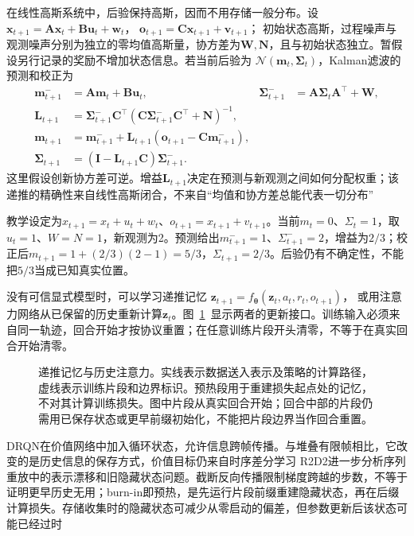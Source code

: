 在线性高斯系统中，后验保持高斯，因而不用存储一般分布。设
$\bm x_{t+1}=\bm A\bm x_t+\bm B\bm u_t+\bm w_t$，
$\bm o_{t+1}=\bm C\bm x_{t+1}+\bm v_{t+1}$；
初始状态高斯，过程噪声与观测噪声分别为独立的零均值高斯量，协方差为$\bm W,\bm N$，且与初始状态独立。暂假设另行记录的奖励不增加状态信息。若当前后验为
$\mathcal N(\bm m_t,\bm\Sigma_t)$，Kalman滤波的预测和校正为
\begin{align}
  \label{eq:rl-information-kalman}
  \bm m^-_{t+1}&=\bm A\bm m_t+\bm B\bm u_t,&
  \bm\Sigma^-_{t+1}&=\bm A\bm\Sigma_t\bm A^\top+\bm W,\nonumber\\
  \bm L_{t+1}&=\bm\Sigma^-_{t+1}\bm C^\top
     (\bm C\bm\Sigma^-_{t+1}\bm C^\top+\bm N)^{-1},\nonumber\\
  \bm m_{t+1}&=\bm m^-_{t+1}
       +\bm L_{t+1}(\bm o_{t+1}-\bm C\bm m^-_{t+1}),\nonumber\\
  \bm\Sigma_{t+1}&=(\bm I-\bm L_{t+1}\bm C)\bm\Sigma^-_{t+1}.
\end{align}
这里假设创新协方差可逆。增益$\bm L_{t+1}$决定在预测与新观测之间如何分配权重；该递推的精确性来自线性高斯闭合，不来自“均值和协方差总能代表一切分布”

\begin{example}[一次标量滤波]
  \label{ex:rl-information-kalman}
  教学设定为$x_{t+1}=x_t+u_t+w_t$、$o_{t+1}=x_{t+1}+v_{t+1}$。当前$m_t=0$、$\Sigma_t=1$，取$u_t=1$、$W=N=1$，新观测为2。预测给出$m^-_{t+1}=1$、$\Sigma^-_{t+1}=2$，增益为$2/3$；校正后$m_{t+1}=1+(2/3)(2-1)=5/3$，$\Sigma_{t+1}=2/3$。后验仍有不确定性，不能把$5/3$当成已知真实位置。
\end{example}

没有可信显式模型时，可以学习递推记忆
$\bm z_{t+1}=f_{\bm\theta}(\bm z_t,a_t,r_t,o_{t+1})$，
或用注意力网络从已保留的历史重新计算$\bm z_t$。图~\ref{fig:rl-information-memory}~显示两者的更新接口。训练输入必须来自同一轨迹，回合开始才按协议重置；在任意训练片段开头清零，不等于在真实回合开始清零。

\begin{figure}[htbp]
  \centering
  
  \caption{递推记忆与历史注意力。实线表示数据送入表示及策略的计算路径，虚线表示训练片段和边界标识。预热段用于重建损失起点处的记忆，不对其计算训练损失。图中片段从真实回合开始；回合中部的片段仍需用已保存状态或更早前缀初始化，不能把片段边界当作回合重置。}
  \label{fig:rl-information-memory}
\end{figure}

DRQN在价值网络中加入循环状态，允许信息跨帧传播。与堆叠有限帧相比，它改变的是历史信息的保存方式，价值目标仍来自时序差分学习
R2D2进一步分析序列重放中的表示漂移和旧隐藏状态问题。截断反向传播限制梯度跨越的步数，不等于证明更早历史无用；burn-in即预热，是先运行片段前缀重建隐藏状态，再在后缀计算损失。存储收集时的隐藏状态可减少从零启动的偏差，但参数更新后该状态可能已经过时

